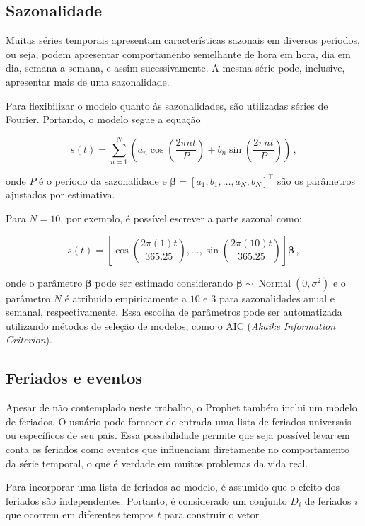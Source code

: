 \subsection{Sazonalidade}
Muitas séries temporais apresentam características sazonais em diversos períodos, ou seja, podem apresentar comportamento semelhante de hora em hora, dia em dia, semana a semana, e assim sucessivamente. A mesma série pode, inclusive, apresentar mais de uma sazonalidade.

Para flexibilizar o modelo quanto às sazonalidades, são utilizadas séries de Fourier. Portando, o modelo segue a equação

\begin{equation}
    s(t)=\sum_{n=1}^{N}\left(a_{n} \cos \left(\frac{2 \pi n t}{P}\right)+b_{n} \sin \left(\frac{2 \pi n t}{P}\right)\right)\, ,
\end{equation}

onde $P$ é o período da sazonalidade e $\boldsymbol{\beta} = [a_{1},b_{1},\ldots,a_{N},b_{N}]^{\top}$ são os parâmetros ajustados por estimativa.

Para $N=10$, por exemplo, é possível escrever a parte sazonal como:

\begin{equation}
    s(t)=\left[\cos \left(\frac{2 \pi(1) t}{365.25}\right), \ldots, \sin \left(\frac{2 \pi(10) t}{365.25}\right)\right]\boldsymbol{\beta} \, ,
\end{equation}

onde o parâmetro $\boldsymbol{\beta}$ pode ser estimado considerando $\boldsymbol{\beta} \sim \operatorname{Normal}\left(0, \sigma^{2}\right)$ e o parâmetro $N$ é atribuido empiricamente a $10$ e $3$ para sazonalidades anual e semanal, respectivamente. Essa escolha de parâmetros pode ser automatizada utilizando métodos de seleção de modelos, como o AIC (\textit{Akaike Information Criterion}).

\subsection{Feriados e eventos}
Apesar de não contemplado neste trabalho, o Prophet também inclui um modelo de feriados. O usuário pode fornecer de entrada uma lista de feriados universais ou específicos de seu país. Essa possibilidade permite que seja possível levar em conta os feriados como eventos que influenciam diretamente no comportamento da série temporal, o que é verdade em muitos problemas da vida real.

Para incorporar uma lista de feriados ao modelo, é assumido que o efeito dos feriados são independentes. Portanto, é considerado um conjunto $D_{i}$ de feriados $i$ que ocorrem em diferentes tempos $t$ para construir o vetor

